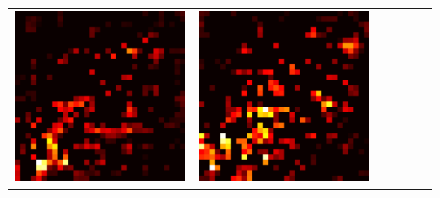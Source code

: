 \documentclass[preprint,12pt]{elsarticle}
\begin{document}
\begin{figure}[p]
\begin{tabular}{cccccc}
  \includegraphics[scale=\scale]{../visualizations/examples/cifar10/cnn/active_saliency_map/3.png} & 
  \includegraphics[scale=\scale]{../visualizations/examples/cifar10/cnn/inactive_saliency_map/3.png} \\
  

\end{tabular}
\end{figure}
\end{document}
